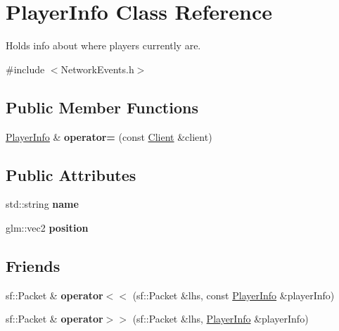 \hypertarget{class_player_info}{\section{Player\-Info Class Reference}
\label{class_player_info}
}


Holds info about where players currently are.  




{\ttfamily \#include $<$Network\-Events.\-h$>$}

\subsection*{Public Member Functions}
\begin{DoxyCompactItemize}
\item 
\hypertarget{class_player_info_a7ee6a2ae8e3330c3647d62c10259e111}{\hyperlink{class_player_info}{Player\-Info} \& {\bfseries operator=} (const \hyperlink{class_client}{Client} \&client)}\label{class_player_info_a7ee6a2ae8e3330c3647d62c10259e111}

\end{DoxyCompactItemize}
\subsection*{Public Attributes}
\begin{DoxyCompactItemize}
\item 
\hypertarget{class_player_info_a016f542d46ef9737c0c217643cb48258}{std\-::string {\bfseries name}}\label{class_player_info_a016f542d46ef9737c0c217643cb48258}

\item 
\hypertarget{class_player_info_ae0b4f6e932dabd8643886924b876f2f1}{glm\-::vec2 {\bfseries position}}\label{class_player_info_ae0b4f6e932dabd8643886924b876f2f1}

\end{DoxyCompactItemize}
\subsection*{Friends}
\begin{DoxyCompactItemize}
\item 
\hypertarget{class_player_info_a6e4982eee930a6b74020f304611ef219}{sf\-::\-Packet \& {\bfseries operator$<$$<$} (sf\-::\-Packet \&lhs, const \hyperlink{class_player_info}{Player\-Info} \&player\-Info)}\label{class_player_info_a6e4982eee930a6b74020f304611ef219}

\item 
\hypertarget{class_player_info_a80ed1c47a3f63a380911a85a5ad24ac3}{sf\-::\-Packet \& {\bfseries operator$>$$>$} (sf\-::\-Packet \&lhs, \hyperlink{class_player_info}{Player\-Info} \&player\-Info)}\label{class_player_info_a80ed1c47a3f63a380911a85a5ad24ac3}

\end{DoxyCompactItemize}


